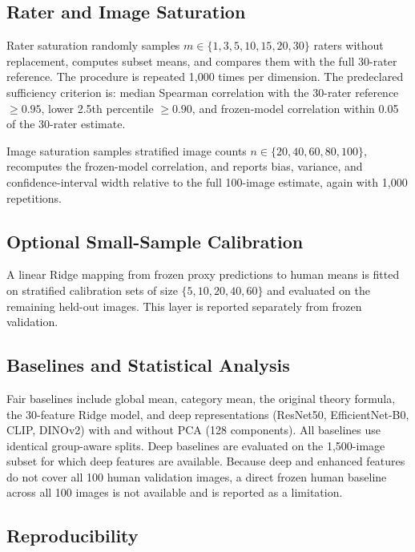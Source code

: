 \subsection{Rater and Image Saturation}
\label{sec:saturation}

Rater saturation randomly samples $m \in \{1,3,5,10,15,20,30\}$ raters without replacement, computes subset means, and compares them with the full 30-rater reference. The procedure is repeated 1,000 times per dimension. The predeclared sufficiency criterion is: median Spearman correlation with the 30-rater reference $\geq 0.95$, lower 2.5th percentile $\geq 0.90$, and frozen-model correlation within 0.05 of the 30-rater estimate.

Image saturation samples stratified image counts $n \in \{20,40,60,80,100\}$, recomputes the frozen-model correlation, and reports bias, variance, and confidence-interval width relative to the full 100-image estimate, again with 1,000 repetitions.

\subsection{Optional Small-Sample Calibration}
\label{sec:calibration}

A linear Ridge mapping from frozen proxy predictions to human means is fitted on stratified calibration sets of size $\{5,10,20,40,60\}$ and evaluated on the remaining held-out images. This layer is reported separately from frozen validation.

\subsection{Baselines and Statistical Analysis}
\label{sec:baselines}

Fair baselines include global mean, category mean, the original theory formula, the 30-feature Ridge model, and deep representations (ResNet50, EfficientNet-B0, CLIP, DINOv2) with and without PCA (128 components). All baselines use identical group-aware splits. Deep baselines are evaluated on the 1,500-image subset for which deep features are available. Because deep and enhanced features do not cover all 100 human validation images, a direct frozen human baseline across all 100 images is not available and is reported as a limitation.

\subsection{Reproducibility}
\label{sec:reproducibility}

